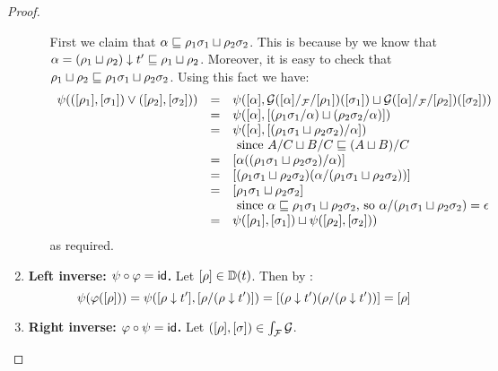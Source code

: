 \begin{proof}
\begin{enumerate}
\begin{enumerate}
    First we claim that $\alpha \sqsubseteq \rho_1\sigma_1 \sqcup \rho_2\sigma_2$.
    This is because by 
    we know that $\alpha = (\rho_1 \sqcup \rho_2) \downarrow t' \sqsubseteq \rho_1 \sqcup \rho_2$.
    Moreover, it is easy to check that
    $\rho_1 \sqcup \rho_2 \sqsubseteq \rho_1\sigma_1 \sqcup \rho_2\sigma_2$.
    Using this fact we have:
    \[
    \begin{array}{rcll}
      \psi(({[\rho_1]},{[\sigma_1]}) \lor ({[\rho_2]},{[\sigma_2]}))
    & = &
      \psi({[\alpha]},\mathcal{G}({[\alpha]}/_{\mathcal{F}}/{[\rho_1]})({[\sigma_1]}) \sqcup \mathcal{G}({[\alpha]}/_{\mathcal{F}}/{[\rho_2]})({[\sigma_2]}))
    \\
    & = &
      \psi({[\alpha]}, {[(\rho_1\sigma_1/\alpha) \sqcup (\rho_2\sigma_2/\alpha)]})
    \\
    & = &
      \psi({[\alpha]}, {[(\rho_1\sigma_1 \sqcup \rho_2\sigma_2)/\alpha]})
    \\&&\text{ since $A/C \sqcup B/C \sqsubseteq (A \sqcup B)/C$} \\
    & = &
      {[\alpha((\rho_1\sigma_1 \sqcup \rho_2\sigma_2)/\alpha)]} \\
    & = &
      {[(\rho_1\sigma_1 \sqcup \rho_2\sigma_2)(\alpha/(\rho_1\sigma_1 \sqcup \rho_2\sigma_2))]} \\
    & = &
      {[\rho_1\sigma_1 \sqcup \rho_2\sigma_2]}
      \\&&\text{ since
                   $\alpha \sqsubseteq \rho_1\sigma_1 \sqcup \rho_2\sigma_2$,
                 so $\alpha/(\rho_1\sigma_1 \sqcup \rho_2\sigma_2) = \epsilon$} \\
    & = &
      \psi({[\rho_1]},{[\sigma_1]}) \sqcup \psi({[\rho_2]},{[\sigma_2]}))
    \end{array}
    \]
    as required.
  \end{enumerate}
\item {\bf Left inverse: $\psi \circ \varphi = \mathsf{id}$.}
  Let ${[\rho]} \in \mathbb{D}(t)$.
  Then by :
  \[
    \psi(\varphi({[\rho]}))
    = \psi({[\rho \downarrow t']}, {[\rho/(\rho \downarrow t')]})
    = {[(\rho \downarrow t')(\rho/(\rho \downarrow t'))]}
    = {[\rho]}
  \]
\item {\bf Right inverse: $\varphi \circ \psi = \mathsf{id}$.}
  Let $({[\rho]},{[\sigma]}) \in \int_{\mathcal{F}}{\mathcal{G}}$.

\end{enumerate}
\end{proof}
